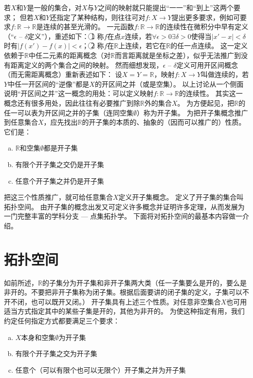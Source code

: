 若$X$和$Y$是一般的集合，对$X$与$Y$之间的映射就只能提出``一一''和``到上''这两个要求；
但若$X$和$Y$还指定了某种结构，则往往可对$f \colon X \to Y$提出更多要求，例如可要求$f \colon \mathbb{R} \to \mathbb{R}$是连续的甚至光滑的。
一元函数$f \colon \mathbb{R} \to \mathbb{R}$的连续性在微积分中早有定义（``$\epsilon$ -- $\delta$定义''），重述如下：
\textcircled{1} 称$f$在点$x$连续，若$\forall \epsilon > 0 \exists \delta > 0$使得当$|x' - x| < \delta$时有$|f(x') - f(x)| < \epsilon$；
\textcircled{2} 称$f$在$\mathbb{R}$上连续，若它在$\mathbb{R}$的任一点连续。
这一定义依赖于$\mathbb{R}$中任二元素的距离概念（对$\mathbb{R}$而言距离就是坐标之差），似乎无法推广到没有距离定义的两个集合之间的映射。
然而细想发现，$\epsilon$ -- $\delta$定义可用开区间概念（而无需距离概念）重新表述如下：
设$X = Y = \mathbb{R}$，映射$f \colon X \to Y$叫做连续的，若$Y$中任一开区间的``逆像''都是$X$的开区间之并（或是空集）。
以上讨论从一个侧面说明``开区间之并''这一概念的用处：可以定义映射$f \colon \mathbb{R} \to \mathbb{R}$的连续性。
其实这一概念还有很多用处，因此往往有必要推广到除$\mathbb{R}$外的集合$X$。
为方便起见，把$\mathbb{R}$的任一可以表为开区间之并的子集（连同空集$\emptyset$）称为开子集。
为把开子集概念推广到任意集合$X$，应先找出$\mathbb{R}$的开子集的本质的、抽象的（因而可以推广的）性质。
它们是：
\begin{enumerate}[(a)]
	\item $\mathbb{R}$和空集$\emptyset$都是开子集
	\item 有限个开子集之交仍是开子集
	\item 任意个开子集之并仍是开子集
\end{enumerate}

把这三个性质推广，就可给任意集合$X$定义开子集概念。
定义了开子集的集合叫拓扑空间。
由开子集的概念出发又可定义许多概念并证明许多定理，从而发展为一门完整丰富的学科分支 --- 点集拓扑学。
下面将对拓扑空间的最基本内容做一介绍。

\section{拓扑空间}

如前所述，$\mathbb{R}$的子集分为开子集和非开子集两大类（任一子集要么是开的，要么是非开的。不要把非开子集称为闭子集。根据后面要讲的闭子集的定义，子集可以不开不闭，也可以既开又闭。）
开子集具有上述三个性质。对任意非空集合$X$也可用适当方式指定其中的某些子集是开的，其他为非开的。
为使这种指定有用，我们约定任何指定方式都要满足三个要求：
\begin{enumerate}[(a)]
	\item $X$本身和空集$\emptyset$为开子集
	\item 有限个开子集之交为开子集
	\item 任意个（可以有限个也可以无限个）开子集之并为开子集
\end{enumerate}


